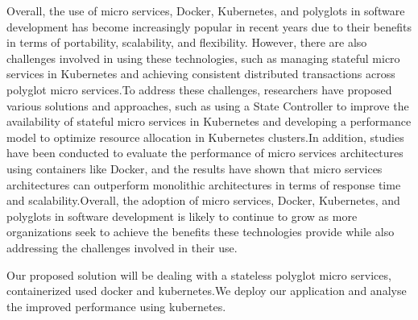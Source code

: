 Overall, the use of micro services, Docker, Kubernetes, and polyglots in software development has become increasingly popular in recent years due to their benefits in terms of portability, scalability, and flexibility. However, there are also challenges involved in using these technologies, such as managing stateful micro services in Kubernetes and achieving consistent distributed transactions across polyglot micro services.To address these challenges, researchers have proposed various solutions and approaches, such as using a State Controller to improve the availability of stateful micro services in Kubernetes and developing a performance model to optimize resource allocation in Kubernetes clusters.In addition, studies have been conducted to evaluate the performance of micro services architectures using containers like Docker, and the results have shown that micro services architectures can outperform monolithic architectures in terms of response time and scalability.Overall, the adoption of micro services, Docker, Kubernetes, and polyglots in software development is likely to continue to grow as more organizations seek to achieve the benefits these technologies provide while also addressing the challenges involved in their use.

Our proposed solution will be dealing with a stateless polyglot micro services, containerized used docker and kubernetes.We deploy our application and analyse the improved performance using kubernetes.

\begin{table}[h]
\end{table}
